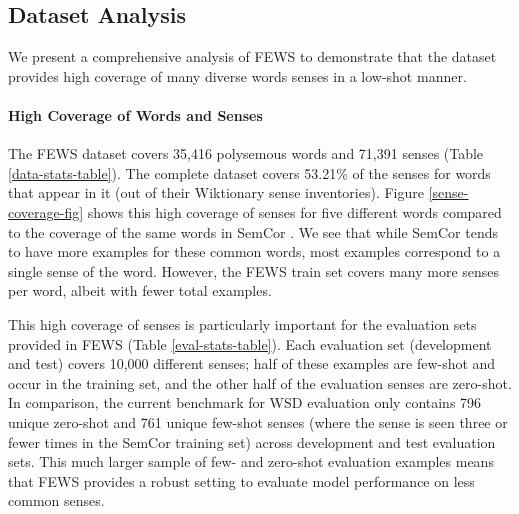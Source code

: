 \documentclass[11pt,a4paper]{article}
\begin{document}
\subsection{Dataset Analysis}
\label{dataset-analysis}

We present a comprehensive analysis of FEWS to demonstrate that the dataset provides high coverage of many diverse words senses in a low-shot manner.

\paragraph{High Coverage of Words and Senses} 
The FEWS dataset covers 35,416 polysemous words and 71,391 senses (Table \ref{data-stats-table}). The complete dataset covers 53.21\% of the senses for words that appear in it (out of their Wiktionary sense inventories). %
Figure \ref{sense-coverage-fig} shows this high coverage of senses for five different words compared to the coverage of the same words in SemCor \cite{miller1993semantic}. We see that while SemCor tends to have more examples for these common words, most examples correspond to a single sense of the word. However, the FEWS train set covers many more senses per word, albeit with fewer total examples.

This high coverage of senses is particularly important for the evaluation sets provided in FEWS (Table \ref{eval-stats-table}). Each evaluation set (development and test) covers 10,000 different senses; half of these examples are few-shot and occur in the training set, and the other half of the evaluation senses are zero-shot. In comparison, the current benchmark for WSD evaluation \cite{raganato2017word} only contains 796 unique zero-shot and 761 unique few-shot senses (where the sense is seen three or fewer times in the SemCor \cite{miller1993semantic} training set) across development and test evaluation sets. This much larger sample of few- and zero-shot evaluation examples means that FEWS provides a robust setting to evaluate model performance on less common senses.
\end{document}
